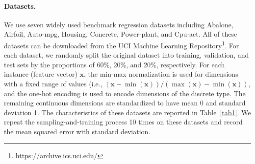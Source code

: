 \documentclass[letterpaper]{article} %
\begin{document}
\paragraph{Datasets.}
We use seven widely used benchmark regression datasets including Abalone, Airfoil, Auto-mpg, Housing, Concrete, Power-plant, and Cpu-act. All of these datasets can be downloaded from the UCI Machine Learning Repository\footnote{https://archive.ics.uci.edu/}. For each dataset, we randomly split the original dataset into training, validation, and test sets by the proportions of 60\%, 20\%, and 20\%, respectively. For each instance (feature vector) $\bm{x}$, the min-max normalization is used for dimensions with a fixed range of values (i.e., $(\bm{x}-\min(\bm{x}))/(\max(\bm{x})-\min(\bm{x}))$, and the one-hot encoding is used to encode dimensions of the discrete type. The remaining continuous dimensions are standardized to have mean 0 and standard deviation 1. The characteristics of these datasets are reported in Table~\ref{tab1}. We repeat the sampling-and-training process 10 times on these datasets and record the mean squared error with standard deviation.
\begin{table}[!t]
\centering
\resizebox{0.45\textwidth}{!}{
\begin{tabular}{c|c|c|c|c}
\toprule
Dataset     & \# Train & \# Test & \# Validation & \# Features    \\ \hline
Abalone     & 2507     & 835     & 835           & 8 \\
Airfoil     & 903      & 300     & 300           & 5 \\
Auto-mpg    & 236      & 78      & 78            & 7  \\
Housing     & 304      & 101     & 101           & 13 \\
Concrete    & 618      & 206     & 206           & 8  \\
Power-plant & 5742     & 1913    & 1913          & 4  \\
Cpu-act     & 4916     & 1638    & 1638          & 21 \\
\bottomrule
\end{tabular}
}
\caption{Characteristics of the used benchmark datasets.}
\label{tab1}
\end{table}
\end{document}
